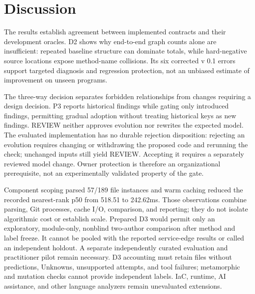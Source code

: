\section{Discussion}
The results establish agreement between implemented contracts and their development oracles. D2 shows why end-to-end graph counts alone are insufficient: repeated baseline structure can dominate totals, while hard-negative source locations expose method-name collisions. Its six corrected v 0.1 errors support targeted diagnosis and regression protection, not an unbiased estimate of improvement on unseen programs.

The three-way decision separates forbidden relationships from changes requiring a design decision. P3 reports historical findings while gating only introduced findings, permitting gradual adoption without treating historical keys as new findings. REVIEW neither approves evolution nor rewrites the expected model. The evaluated implementation has no durable rejection disposition: rejecting an evolution requires changing or withdrawing the proposed code and rerunning the check; unchanged inputs still yield REVIEW. Accepting it requires a separately reviewed model change. Owner protection is therefore an organizational prerequisite, not an experimentally validated property of the gate.

Component scoping parsed 57/189 file instances and warm caching reduced the recorded nearest-rank p50 from 518.51 to 242.62ms. Those observations combine parsing, Git processes, cache I/O, comparison, and reporting; they do not isolate algorithmic cost or establish scale. Prepared D3 would permit only an exploratory, module-only, nonblind two-author comparison after method and label freeze. It cannot be pooled with the reported service-edge results or called an independent holdout. A separate independently curated evaluation and practitioner pilot remain necessary. D3 accounting must retain files without predictions, Unknowns, unsupported attempts, and tool failures; metamorphic and mutation checks cannot provide independent labels. IaC, runtime, AI assistance, and other language analyzers remain unevaluated extensions.
